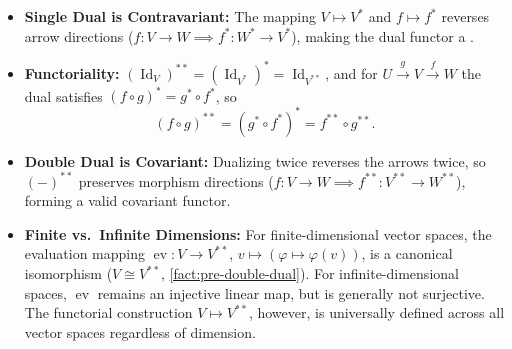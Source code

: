 \begin{content}
\begin{center}
\end{center}

\begin{steps}
\begin{itemize}
    \item \textbf{Single Dual is Contravariant:} The mapping $V \mapsto V^*$ and $f \mapsto f^*$ reverses arrow directions ($f \colon V \to W \implies f^* \colon W^* \to V^*$), making the dual functor a .
    \item \textbf{Functoriality:} $(\operatorname{Id}_V)^{**} = (\operatorname{Id}_{V^*})^* = \operatorname{Id}_{V^{**}}$, and for $U \xrightarrow{g} V \xrightarrow{f} W$ the dual satisfies $(f \circ g)^* = g^* \circ f^*$, so
    \[
    (f \circ g)^{**} = (g^* \circ f^*)^* = f^{**} \circ g^{**}.
    \]
    \item \textbf{Double Dual is Covariant:} Dualizing twice reverses the arrows twice, so $(-)^{**}$ preserves morphism directions ($f \colon V \to W \implies f^{**} \colon V^{**} \to W^{**}$), forming a valid covariant functor.
    \item \textbf{Finite vs.\ Infinite Dimensions:} For finite-dimensional vector spaces, the evaluation mapping $\operatorname{ev} \colon V \to V^{**}$, $v \mapsto (\varphi \mapsto \varphi(v))$, is a canonical isomorphism ($V \cong V^{**}$, \cref{fact:pre-double-dual}). For infinite-dimensional spaces, $\operatorname{ev}$ remains an injective linear map, but is generally not surjective. The functorial construction $V \mapsto V^{**}$, however, is universally defined across all vector spaces regardless of dimension.
\end{itemize}
\end{steps}
\end{content}

